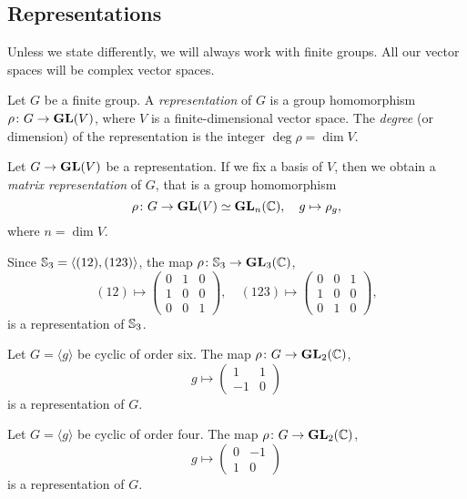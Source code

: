 \subsection{Representations}

Unless we state differently, we will always work
with finite groups. All our vector spaces will
be complex vector spaces. 

\begin{definition}
    Let $G$ be a finite group. A \emph{representation}
    of $G$ is a group homomorphism $\rho\colon G\to\mathbf{GL}(V)$, where
    $V$ is a finite-dimensional vector space. The \emph{degree} (or dimension) 
    of the representation is the integer $\deg\rho=\dim V$. 
\end{definition}

Let $G\to\mathbf{GL}(V)$ be a representation. 
If we fix a basis of $V$, then we obtain
a \emph{matrix representation} of $G$, that is a 
group homomorphism 
\[
\rho\colon G\to\mathbf{GL}(V)\simeq\mathbf{GL}_n(\mathbb{C}),
\quad 
g\mapsto\rho_g,
\]
where
$n=\dim V$. 

\begin{example}
Since $\mathbb{S}_3=\langle (12),(123)\rangle$, the map $\rho\colon \mathbb{S}_3\to\mathbf{GL}_3(\mathbb{C})$,
\[
(12)\mapsto\begin{pmatrix}
0 & 1 & 0\\
1 & 0 & 0\\
0 & 0 & 1
\end{pmatrix},\quad
(123)\mapsto\begin{pmatrix}
0 & 0 & 1\\
1 & 0 & 0\\
0 & 1 & 0
\end{pmatrix},
\] 
is a representation of $\mathbb{S}_3$. 
\end{example}

\begin{example}
Let $G=\langle g\rangle$ be cyclic of order six. 
The map $\rho\colon G\to\mathbf{GL}_2(\mathbb{C})$, 
\[
g\mapsto
\begin{pmatrix}
1&1\\
-1&0
\end{pmatrix}
\] 
is a representation of $G$. 
\end{example}

\begin{example}
Let $G=\langle g\rangle$ be cyclic of order four. 
The map $\rho\colon G\to\mathbf{GL}_2(\mathbb{C})$, 
\[
g\mapsto
\begin{pmatrix}
0&-1\\
1&0
\end{pmatrix}
\] 
is a representation of $G$. 
\end{example}

